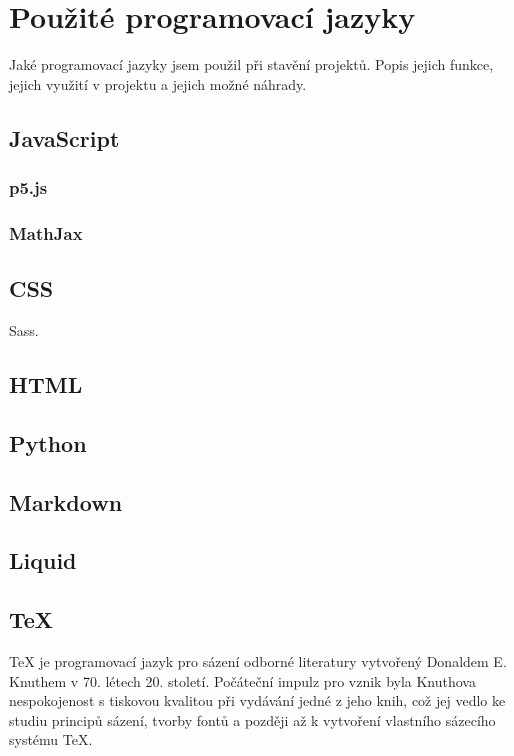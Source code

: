 \documentclass[a4paper, 12pt]{article}
\begin{document}
  \section{Použité programovací jazyky}
  Jaké programovací jazyky jsem použil při stavění projektů.
  Popis jejich funkce, jejich využití v projektu a jejich možné náhrady.

  \subsection{JavaScript}

  \subsubsection{p5.js}

  \subsubsection{MathJax}

  \subsection{CSS}
  Sass.

  \subsection{HTML}

  \subsection{Python}

  \subsection{Markdown} \label{sec:Markdown}

  \subsection{Liquid}

  \subsection{\TeX{}} \label{sec:TeX}
  \TeX{} je programovací jazyk pro sázení odborné literatury vytvořený Donaldem E. Knuthem v 70. létech 20. století. Počáteční impulz pro vznik byla Knuthova nespokojenost s tiskovou kvalitou při vydávání jedné z jeho knih, což jej vedlo ke studiu principů sázení, tvorby fontů a později až k vytvoření vlastního sázecího systému \TeX\cite{tex-history}.
\end{document}

